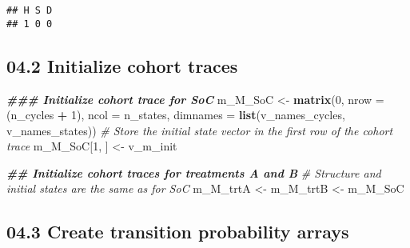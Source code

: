 \documentclass[
]{article}
\newenvironment{Shaded}{\begin{snugshade}}{\end{snugshade}}
\newcommand{\AttributeTok}[1]{\textcolor[rgb]{0.13,0.29,0.53}{#1}}
\newcommand{\CommentTok}[1]{\textcolor[rgb]{0.56,0.35,0.01}{\textit{#1}}}
\newcommand{\DecValTok}[1]{\textcolor[rgb]{0.00,0.00,0.81}{#1}}
\newcommand{\DocumentationTok}[1]{\textcolor[rgb]{0.56,0.35,0.01}{\textbf{\textit{#1}}}}
\newcommand{\FunctionTok}[1]{\textcolor[rgb]{0.13,0.29,0.53}{\textbf{#1}}}
\newcommand{\NormalTok}[1]{#1}
\newcommand{\OtherTok}[1]{\textcolor[rgb]{0.56,0.35,0.01}{#1}}
\newcommand{\SpecialCharTok}[1]{\textcolor[rgb]{0.81,0.36,0.00}{\textbf{#1}}}
\begin{document}
\begin{verbatim}
## H S D 
## 1 0 0
\end{verbatim}

\hypertarget{initialize-cohort-traces}{%
\subsection{04.2 Initialize cohort
traces}\label{initialize-cohort-traces}}

\begin{Shaded}
\begin{Highlighting}[]
\DocumentationTok{\#\#\# Initialize cohort trace for SoC }
\NormalTok{m\_M\_SoC }\OtherTok{\textless{}{-}} \FunctionTok{matrix}\NormalTok{(}\DecValTok{0}\NormalTok{, }
                  \AttributeTok{nrow =}\NormalTok{ (n\_cycles }\SpecialCharTok{+} \DecValTok{1}\NormalTok{), }\AttributeTok{ncol =}\NormalTok{ n\_states, }
                  \AttributeTok{dimnames =} \FunctionTok{list}\NormalTok{(v\_names\_cycles, v\_names\_states))}
\CommentTok{\# Store the initial state vector in the first row of the cohort trace}
\NormalTok{m\_M\_SoC[}\DecValTok{1}\NormalTok{, ] }\OtherTok{\textless{}{-}}\NormalTok{ v\_m\_init}

\DocumentationTok{\#\# Initialize cohort traces for treatments A and B}
\CommentTok{\# Structure and initial states are the same as for SoC}
\NormalTok{m\_M\_trtA }\OtherTok{\textless{}{-}}\NormalTok{ m\_M\_trtB }\OtherTok{\textless{}{-}}\NormalTok{ m\_M\_SoC}
\end{Highlighting}
\end{Shaded}

\hypertarget{create-transition-probability-arrays}{%
\subsection{04.3 Create transition probability
arrays}\label{create-transition-probability-arrays}}
\end{document}
